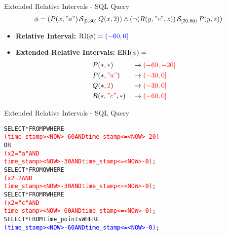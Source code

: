 \begin{frame}{Extended Relative Intervals - SQL Query}
    \begin{align*}
        \phi = 
        (P(x, "a") \,\mathcal{S}_{[0,30)}\, Q(x, 2))
        \land 
        (\neg (R(y, "c", z)) \,\mathcal{S}_{[20,60)}\, P(y, z))
    \end{align*}
    \begin{itemize}
        \item \textbf{Relative Interval:} $\operatorname{RI}(\phi) = \textcolor{blue}{(-60,0]}$
        \item \textbf{Extended Relative Intervals:} $\operatorname{ERI}(\phi) =$
        \begin{alignat*}{3}
            &P(*,*)                       &&\to \textcolor{red}{(-60,-20]}\\
            &P(*,\textcolor{red}{"a"})    &&\to \textcolor{red}{(-30,0]}\\
            &Q(*,\textcolor{red}{2})      &&\to \textcolor{red}{(-30,0]}\\
            &R(*,\textcolor{red}{"c"},*)  &&\to \textcolor{red}{(-60,0]}
        \end{alignat*}
    \end{itemize}
\end{frame}

\begin{frame}[fragile]{Extended Relative Intervals - SQL Query}
\begin{alltt}
SELECT * FROM P WHERE
    \textcolor{red}{(time_stamp > <NOW>-60 AND time_stamp <= <NOW>-20)}
    OR
    \textcolor{red}{(x2 = "a" AND
    time_stamp > <NOW> -30 AND time_stamp <= <NOW>-0)};
SELECT * FROM Q WHERE
    \textcolor{red}{(x2 = 2 AND
    time_stamp > <NOW>-30 AND time_stamp <= <NOW>-0)};
SELECT * FROM R WHERE
    \textcolor{red}{(x2 = "c" AND
    time_stamp > <NOW>-60 AND time_stamp <= <NOW>-0)};
SELECT * FROM time_points WHERE
    \textcolor{blue}{(time_stamp > <NOW>-60 AND time_stamp <= <NOW>-0)};
\end{alltt}
\end{frame}


